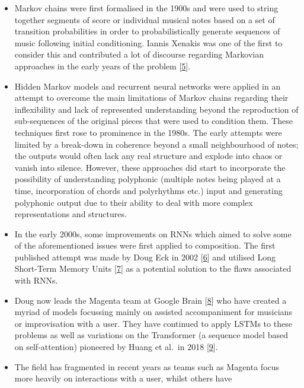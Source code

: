 \documentclass[12pt,]{article}
\providecommand{\tightlist}{%
  \setlength{\itemsep}{0pt}\setlength{\parskip}{0pt}}
\begin{document}
\begin{itemize}
\tightlist
\item
  Markov chains were first formalised in the 1900s and were used to
  string together segments of score or individual musical notes based on
  a set of transition probabilities in order to probabilistically
  generate sequences of music following initial conditioning. Iannis
  Xenakis was one of the first to consider this and contributed a lot of
  discourse regarding Markovian approaches in the early years of the
  problem {[}\protect\hyperlink{ref-luque2009stochastic}{5}{]}.
\item
  Hidden Markov models and recurrent neural networks were applied in an
  attempt to overcome the main limitations of Markov chains regarding
  their inflexibility and lack of represented understanding beyond the
  reproduction of sub-sequences of the original pieces that were used to
  condition them. These techniques first rose to prominence in the
  1980s. The early attempts were limited by a break-down in coherence
  beyond a small neighbourhood of notes; the outputs would often lack
  any real structure and explode into chaos or vanish into silence.
  However, these approaches did start to incorporate the possibility of
  understanding polyphonic (multiple notes being played at a time,
  incorporation of chords and polyrhythms etc.) input and generating
  polyphonic output due to their ability to deal with more complex
  representations and structures.
\item
  In the early 2000s, some improvements on RNNs which aimed to solve
  some of the aforementioned issues were first applied to composition.
  The first published attempt was made by Doug Eck in 2002
  {[}\protect\hyperlink{ref-eck2002finding}{6}{]} and utilised Long
  Short-Term Memory Units
  {[}\protect\hyperlink{ref-gers1999learning}{7}{]} as a potential
  solution to the flaws associated with RNNs.
\item
  Doug now leads the Magenta team at Google Brain
  {[}\protect\hyperlink{ref-magenta}{8}{]} who have created a myriad of
  models focussing mainly on assisted accompaniment for musicians or
  improvisation with a user. They have continued to apply LSTMs to these
  problems as well as variations on the Transformer (a sequence model
  based on self-attention) pioneered by Huang et al.~in 2018
  {[}\protect\hyperlink{ref-huang2018improved}{9}{]}.
\item
  The field has fragmented in recent years as teams such as Magenta
  focus more heavily on interactions with a user, whilst others have

\end{itemize}
\end{document}

